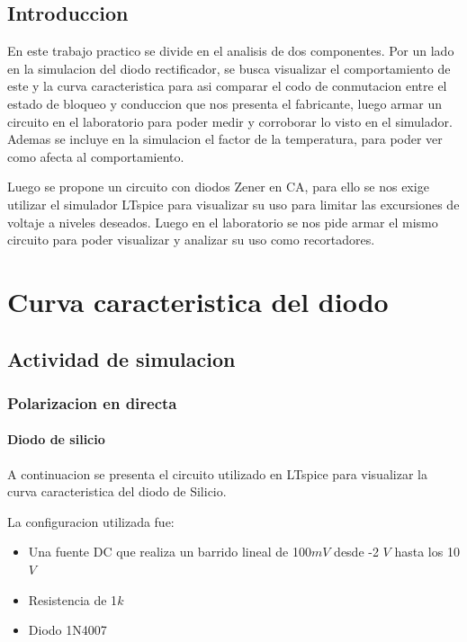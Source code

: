 \documentclass[chaptersright]{informeutn}
\date{1 / 1 / 2025}
\begin{document}
  \maketitle

  \myemptypage

  \tableofcontents
  \setcounter{page}{1}
  \thispagestyle{plain}

  \myemptypage

  \chapter{Introduccion}
    En este trabajo practico se divide en el analisis de dos componentes. Por un lado en la simulacion del diodo
    rectificador, se busca visualizar el comportamiento de este y la curva caracteristica para asi comparar el codo de
    conmutacion entre el estado de bloqueo y conduccion que nos presenta el fabricante, luego armar un circuito en el
    laboratorio para poder medir y corroborar lo visto en el simulador. Ademas se incluye en la simulacion el factor de
    la temperatura, para poder ver como afecta al comportamiento.

    Luego se propone un circuito con diodos Zener en CA, para ello se nos exige utilizar el simulador LTspice para
    visualizar su uso para limitar las excursiones de voltaje a niveles deseados. Luego en el laboratorio se nos pide
    armar el mismo circuito para poder visualizar y analizar su uso como recortadores.

  \part{Curva caracteristica del diodo}
    \chapter{Actividad de simulacion}
      \section{Polarizacion en directa}
        \subsection{Diodo de silicio}
          A continuacion se presenta el circuito utilizado en LTspice para visualizar la curva caracteristica del diodo
          de Silicio.

          La configuracion utilizada fue:
          \begin{itemize}
            \item Una fuente DC que realiza un barrido lineal de 100$mV$ desde -2 $V$ hasta los 10 $V$ 
            \item Resistencia de 1$k$
            \item Diodo 1N4007
          \end{itemize}
\end{document}
